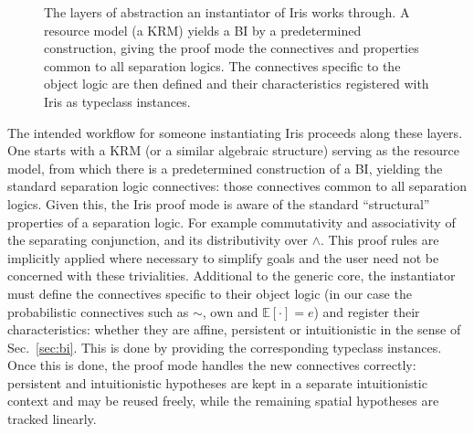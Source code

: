 \begin{figure}[htbp]
  \centering
  \caption{The layers of abstraction an instantiator of Iris works through. A resource model
  (a KRM) yields a BI by a predetermined construction, giving the proof mode the connectives and
  properties common to all separation logics. The connectives specific to the object logic are then
  defined and their characteristics registered with Iris as typeclass instances.}
  \label{fig:iris-layers}
\end{figure}

The intended workflow for someone instantiating Iris proceeds along these layers. One starts with a KRM (or a similar algebraic structure) serving as the resource
model, from which there is a predetermined construction of a BI, yielding the standard separation logic connectives: those connectives common to all separation logics. Given this, the Iris proof mode is
aware of the standard ``structural'' properties of a separation logic. For example commutativity and associativity of the separating conjunction, and
its distributivity over $\wedge$. This proof rules are implicitly applied where necessary to simplify goals and the user need not be concerned with
these trivialities. Additional to the generic core, the
instantiator must define the connectives specific to their object logic (in our case the probabilistic connectives such as $\sim$, $\mathrm{own}$ and $\mathbb{E}[\cdot]=e$)
and register their characteristics: whether they are affine, persistent or intuitionistic in the sense of Sec.~\ref{sec:bi}. This is done by providing the corresponding
typeclass instances. Once this is done, the proof mode handles the new connectives correctly: persistent and intuitionistic hypotheses are kept in a separate
intuitionistic context and may be reused freely, while the remaining spatial hypotheses are tracked linearly.

